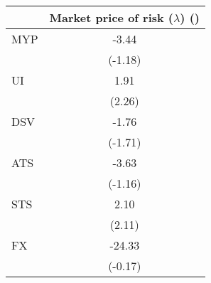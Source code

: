\begin{tabular}{l*{1}{c}}
\hline
\hline
& Market price of risk ($\lambda$) (\times 100)\\
\hline
MYP & -3.44\\
   & (-1.18)\\
UI & 1.91\\
   & (2.26)\\
DSV & -1.76\\
   & (-1.71)\\
ATS & -3.63\\
   & (-1.16)\\
STS & 2.10\\
   & (2.11)\\
FX & -24.33\\
   & (-0.17)\\
\hline
\hline
\end{tabular}
